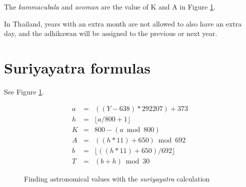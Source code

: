 \documentclass[11pt,oneside]{memoir-article}
\begin{document}
The \emph{kammacubala} and \emph{avoman} are the value of K and A in Figure
\ref{fig-suriyayatra}.

In Thailand, years with an extra month are not allowed to also have an
extra day, and the adhikawan will be assigned to the previous or next
year.

\section{Suriyayatra formulas}
\label{sec-4-5}

See Figure \ref{fig-suriyayatra}.

\begin{figure}
\caption{\label{fig-suriyayatra}Finding astronomical values with the \emph{suriyayatra} calculation\cite{eade-interpolation}}
\begin{eqnarray}
a & = & ((Y - 638) * 292207) + 373 \\
h & = & \lfloor a/800 + 1 \rfloor \\
K & = & 800 - (a \bmod 800) \\
A & = & ((h*11) + 650) \bmod 692 \\
b & = & \lfloor ((h*11) + 650) / 692 \rfloor \\
T & = & (b + h) \bmod 30
\end{eqnarray}
\end{figure}
\end{document}
